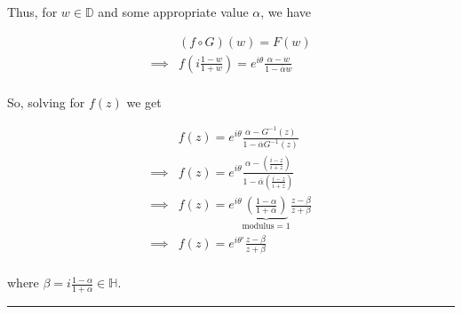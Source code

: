 \documentclass{article}
\begin{document}
Thus, for $w \in \mathbb{D}$ and some appropriate value $\alpha$, we have

\begin{align*}
  &\left(f \circ G\right)(w) = F(w) \\
  \implies& f\left( i\frac{1-w}{1+w} \right) = e^{i\theta}  \frac{\alpha - w}{1 - \overline{\alpha} w}\\
\end{align*}

So, solving for $f(z)$ we get 

\begin{align*}
  &f(z) = e^{i\theta}\frac{\alpha - G^{-1}(z)}{1 - \overline{\alpha} G^{-1}(z)} \\
  \implies&f(z) = e^{i\theta} \frac{\alpha - \left(\frac{i-z}{i+z} \right) }{1 - \overline{\alpha} \left(\frac{i-z}{i+z} \right)} \\
  \implies&f(z) = e^{i\theta} \underbrace{\left( \frac{1-\alpha}{1+\overline{\alpha}} \right)}_{\text{modulus} = 1} \frac{z - \beta}{z + \beta}  \\
  \implies&f(z) = e^{i\theta'} \frac{z - \beta}{z + \beta}  \\
\end{align*}

where $\beta = i \frac{1-\alpha}{1+\alpha} \in \mathbb{H}$. 


\vskip 0.5cm
\hrule 
\vskip 0.5cm







\end{document}

